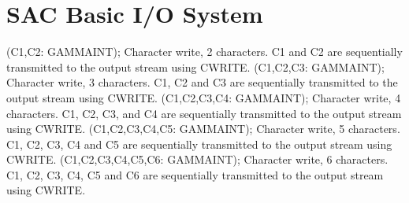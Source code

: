 \section{ SAC Basic I/O System  } 
 (C1,C2: GAMMAINT); \eproc
\bcom Character write, 2 characters. C1 and C2 are sequentially
transmitted to the output stream using CWRITE. \ecom 
{} (C1,C2,C3: GAMMAINT); \eproc
\bcom Character write, 3 characters. C1, C2 and C3 are sequentially
transmitted to the output stream using CWRITE. \ecom 
{} (C1,C2,C3,C4: GAMMAINT); \eproc
\bcom Character write, 4 characters. C1, C2, C3, and C4 are sequentially
transmitted to the output stream using CWRITE. \ecom 
{} (C1,C2,C3,C4,C5: GAMMAINT); \eproc
\bcom Character write, 5 characters. C1, C2, C3, C4 and C5 are
sequentially transmitted to the output stream using CWRITE. \ecom 
{} (C1,C2,C3,C4,C5,C6: GAMMAINT); \eproc
\bcom Character write, 6 characters. C1, C2, C3, C4, C5 and C6 are
sequentially transmitted to the output stream using CWRITE. \ecom 
